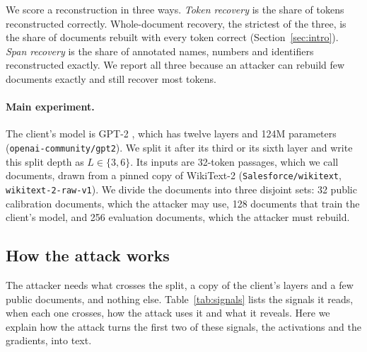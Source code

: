 \documentclass[11pt]{article}
\begin{document}
We score a reconstruction in three ways. \emph{Token recovery} is the share of tokens reconstructed correctly. Whole-document recovery, the strictest of the three, is the share of documents rebuilt with every token correct (Section~\ref{sec:intro}). \emph{Span recovery} is the share of annotated names, numbers and identifiers reconstructed exactly. We report all three because an attacker can rebuild few documents exactly and still recover most tokens.

\paragraph{Main experiment.}
The client's model is GPT-2 \cite{radford2019gpt2}, which has twelve layers and 124M parameters (\texttt{openai-community/gpt2}). We split it after its third or its sixth layer and write this split depth as $L \in \{3, 6\}$. Its inputs are 32-token passages, which we call documents, drawn from a pinned copy of WikiText-2 \cite{merity2016wikitext} (\texttt{Salesforce/wikitext}, \texttt{wikitext-2-raw-v1}). We divide the documents into three disjoint sets: 32 public calibration documents, which the attacker may use, 128 documents that train the client's model, and 256 evaluation documents, which the attacker must rebuild.

\subsection{How the attack works}
\label{sec:attack}
The attacker needs what crosses the split, a copy of the client's layers and a few public documents, and nothing else. Table~\ref{tab:signals} lists the signals it reads, when each one crosses, how the attack uses it and what it reveals. Here we explain how the attack turns the first two of these signals, the activations and the gradients, into text.
\end{document}

